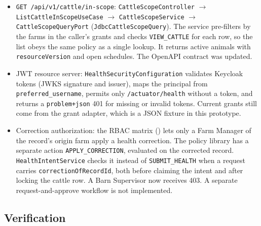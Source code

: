 \begin{itemize}
\item \texttt{GET /api/v1/cattle/in-scope}:
\texttt{CattleScopeController} $\rightarrow$
\texttt{ListCattleInScopeUseCase} $\rightarrow$
\texttt{CattleScopeService} $\rightarrow$ \texttt{CattleScopeQueryPort}
(\texttt{JdbcCattleScopeQuery}). The service pre-filters by the farms
in the caller's grants and checks \texttt{VIEW\_CATTLE} for each row,
so the list obeys the same policy as a single lookup. It returns
active animals with \texttt{resourceVersion} and open schedules. The
OpenAPI contract was updated.
\item JWT resource server: \texttt{HealthSecurityConfiguration}
validates Keycloak tokens (JWKS signature and issuer), maps the
principal from \texttt{preferred\_username}, permits only
\texttt{/actuator/health} without a token, and returns a
\texttt{problem+json} 401 for missing or invalid tokens. Current grants
still come from the grant adapter, which is a JSON fixture in this
prototype.
\item Correction authorization: the RBAC matrix () lets
only a Farm Manager of the record's origin farm apply a health
correction. The policy library has a separate action
\texttt{APPLY\_CORRECTION}, evaluated on the corrected record.
\texttt{HealthIntentService} checks it instead of
\texttt{SUBMIT\_HEALTH} when a request carries
\texttt{correctionOfRecordId}, both before claiming the intent and after
locking the cattle row. A Barn Supervisor now receives 403. A separate
request-and-approve workflow is not implemented.
\end{itemize}

\subsection{Verification}\label{sec:m2-mobile-verification}


